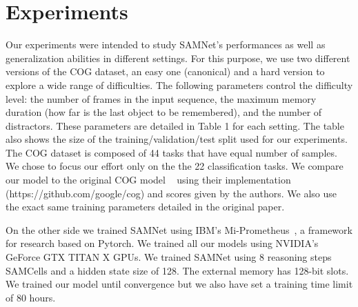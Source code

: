 \section{Experiments}


Our experiments were intended to study SAMNet's performances as well as generalization abilities in different settings. For this purpose, we use two different versions of the COG dataset, an easy one (canonical) and a hard version to explore a wide range of difficulties. The following parameters control the difficulty level: the number of frames in the input sequence, the maximum memory duration (how far is the last object to be remembered), and the number of distractors. These parameters are detailed in Table 1 for each setting. The table also shows the size of the training/validation/test split used for our experiments. The COG dataset is composed of 44 tasks that have equal number of samples.
We chose to focus our effort only on the the 22 classification tasks.
We compare our model to the original COG model  ~\cite{yang2018dataset} using their implementation (https://github.com/google/cog) and scores given by the authors. We also use the exact same training parameters detailed in the original paper.

On the other side we trained SAMNet using IBM's Mi-Prometheus~\cite{kornuta2018accelerating}, a framework for research based on Pytorch. We trained all our models using NVIDIA’s GeForce GTX TITAN X GPUs. We trained  SAMNet using 8 reasoning steps SAMCells and a hidden state size of 128. The external memory has 128-bit slots. We trained our model until convergence but we also have set a training time limit of 80 hours.



\begin{table}[!t]
	\centering
	\caption{COG Dataset parameters for the canonical setting and the hard setting  }

	
	\label{tab:parameters}
\end{table}



